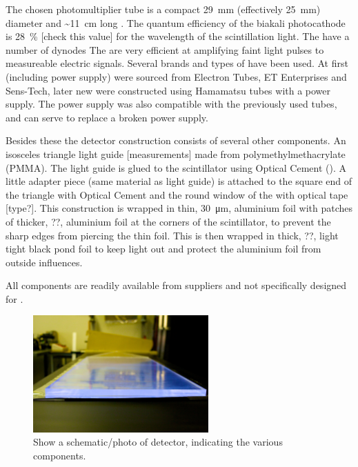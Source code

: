 The chosen photomultiplier tube \cite{et:pmt} is a compact \SI{29}{\milli\meter} (effectively \SI{25}{\milli\meter}) diameter and \SI{~11}{\centi\meter} long \pmt. The quantum efficiency of the biakali photocathode is \SI{28}{\percent} [check this value] for the wavelength of the scintillation light. The \pmts have a number of dynodes The \pmts are very efficient at amplifying faint light pulses to measureable electric signals. Several brands and types of \pmts have been used. At first \pmts (including power supply) were sourced from Electron Tubes, ET Enterprises and Sens-Tech, later new \pmts were constructed using Hamamatsu tubes with a \nikhef power supply. The \nikhef power supply was also compatible with the previously used tubes, and can serve to replace a broken power supply.

Besides these the detector construction consists of several other components. An isosceles triangle light guide [measurements] made from polymethylmethacrylate (PMMA). The light guide is glued to the scintillator using Optical Cement (\cite{bc600}). A little adapter piece (same material as light guide) is attached to the square end of the triangle with Optical Cement and the round window of the \pmt with optical tape [type?]. This construction is wrapped in thin, \SI{30}{\micro\meter}, aluminium foil with patches of thicker, ??, aluminium foil at the corners of the scintillator, to prevent the sharp edges from piercing the thin foil. This is then wrapped in thick, ??, light tight black pond foil to keep light out and protect the aluminium foil from outside influences.

All components are readily available from suppliers and not specifically designed for \hisparc.

\begin{figure}
    \centering
    \includegraphics[width=0.6\textwidth]
                    {plots/experiment/ADL_115651.jpg}
    \caption{Show a schematic/photo of detector, indicating the various components.}
    \label{fig:schematic_detector}
\end{figure}


